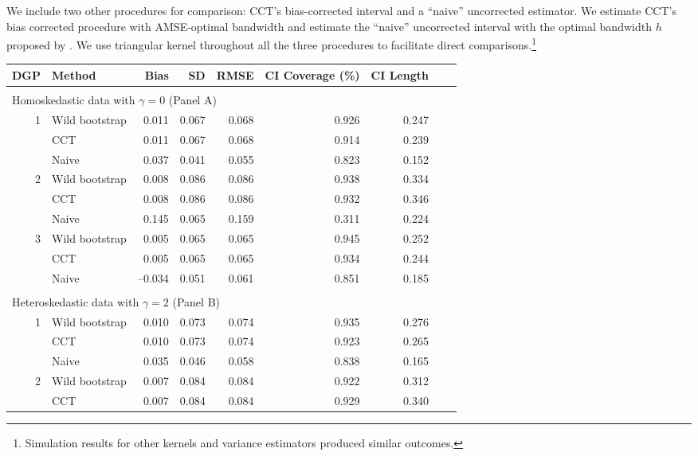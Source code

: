 \documentclass[12pt,fleqn]{article}
\begin{document}
We include two other procedures for comparison: CCT's bias-corrected interval and a ``naive'' uncorrected estimator.
 We estimate CCT's bias corrected procedure with AMSE-optimal bandwidth and estimate
the ``naive'' uncorrected interval with the optimal bandwidth $h$ proposed by
\cite{IK}. We use triangular kernel throughout all the three procedures to facilitate direct comparisons.\footnote{%
Simulation results for other kernels and variance estimators produced similar outcomes.} %

\begin{table}[t]
  \centering
  \begin{tabular}{rlrrrrrrr}
    \toprule
    DGP & Method       & Bias    & SD    & RMSE  & CI Coverage (\%) & CI Length \\
    \midrule                                                     \\
    \multicolumn{7}{l}{Homoskedastic data with $\gamma = 0$ (Panel A)}  \\
    \midrule
    1 & Wild bootstrap & 0.011 & 0.067 & 0.068 & 0.926 & 0.247 \\
      & CCT            & 0.011 & 0.067 & 0.068 & 0.914 & 0.239 \\
      & Naive          & 0.037 & 0.041 & 0.055 & 0.823 & 0.152 \\
    2 & Wild bootstrap & 0.008 & 0.086 & 0.086 & 0.938 & 0.334 \\
      & CCT            & 0.008 & 0.086 & 0.086 & 0.932 & 0.346 \\
      & Naive          & 0.145 & 0.065 & 0.159 & 0.311 & 0.224 \\
    3 & Wild bootstrap & 0.005 & 0.065 & 0.065 & 0.945 & 0.252 \\
      & CCT            & 0.005 & 0.065 & 0.065 & 0.934 & 0.244 \\
      & Naive          & --0.034 & 0.051 & 0.061 & 0.851 & 0.185 \\  \\
    \multicolumn{7}{l}{Heteroskedastic data with $\gamma = 2$ (Panel B)}  \\
    \midrule
    1 & Wild bootstrap & 0.010 & 0.073 & 0.074 & 0.935 & 0.276 \\
      & CCT            & 0.010 & 0.073 & 0.074 & 0.923 & 0.265 \\
      & Naive          & 0.035 & 0.046 & 0.058 & 0.838 & 0.165 \\
    2 & Wild bootstrap & 0.007 & 0.084 & 0.084 & 0.922 & 0.312 \\
      & CCT            & 0.007 & 0.084 & 0.084 & 0.929 & 0.340 \\

\end{tabular}
\end{table}
\end{document}
